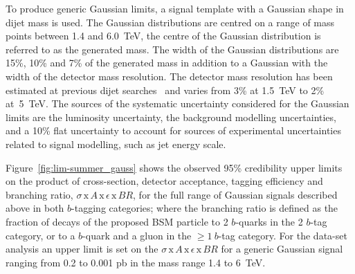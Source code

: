 \newpage 
To produce generic Gaussian limits,
a signal template with a Gaussian shape in dijet mass is used.
The Gaussian distributions are centred on a range of mass points between 1.4 and 6.0~TeV,
the centre of the  Gaussian distribution is referred to as the generated mass.
The width of the Gaussian distributions are
15\%, 10\% and 7\% of the generated mass
in addition to a Gaussian with the width of the detector mass resolution.
The detector mass resolution has been estimated
at previous dijet searches~\cite{dijet-mori16_paper}
and varies from 3\% at 1.5~TeV to 2\% at~5~TeV.
The sources of the systematic uncertainty considered for the Gaussian limits 
are the luminosity uncertainty,
the background modelling uncertainties,
and a 10\% flat uncertainty to account for sources of
experimental uncertainties related to signal modelling,
such as jet energy scale.

Figure~\ref{fig:lim-summer_gauss} shows the observed 95\% credibility upper limits
on the product of cross-section, detector acceptance, tagging efficiency and branching ratio,
$\sigma\,\text{x}\,\mathit{A}\,\text{x}\,\epsilon\,\text{x}\,\mathit{BR}$,
for the full range of Gaussian signals described above in both $b$-tagging categories;
where the branching ratio is defined as the fraction of decays of the proposed BSM particle to 2 $b$-quarks in the 2 $b$-tag category,
or to a $b$-quark and a gluon in the $\geq1~b$-tag category.
For the \summer{} data-set analysis an upper limit is set on the $\sigma\,\text{x}\,\mathit{A}\,\text{x}\,\epsilon\,\text{x}\,\mathit{BR}$
for a generic Gaussian signal ranging from 0.2 to 0.001 pb in the mass range 1.4 to 6~TeV.

